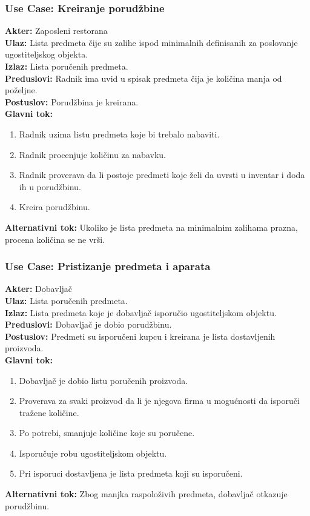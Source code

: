 \documentclass{article}
\begin{document}
\subsubsection{\textbf{Use Case}: Kreiranje porudžbine}
\textbf{Akter:} Zaposleni restorana\\
\textbf{Ulaz:} Lista predmeta čije su zalihe ispod minimalnih definisanih za poslovanje ugostiteljskog objekta.\\
\textbf{Izlaz:} Lista poručenih predmeta.\\
\textbf{Preduslovi:} Radnik ima uvid u spisak predmeta čija je količina manja od poželjne.\\
\textbf{Postuslov:} Porudžbina je kreirana.\\
\textbf{Glavni tok:} 
\begin{enumerate}
	\item Radnik uzima listu predmeta koje bi trebalo nabaviti.
	\item Radnik procenjuje količinu za nabavku. 
	\item Radnik proverava da li postoje predmeti koje želi da uvrsti u inventar i doda ih u porudžbinu.
	\item Kreira porudžbinu.
\end{enumerate}
\textbf{Alternativni tok:} Ukoliko je lista predmeta na minimalnim zalihama prazna, procena količina se ne vrši.\\

\subsubsection{\textbf{Use Case}:  Pristizanje predmeta i aparata}
\textbf{Akter:} Dobavljač\\
\textbf{Ulaz:} Lista poručenih predmeta.\\
\textbf{Izlaz:} Lista predmeta koje je dobavljač isporučio ugostiteljskom objektu.\\
\textbf{Preduslovi:} Dobavljač je dobio porudžbinu.\\
\textbf{Postuslov:} Predmeti su isporučeni kupcu i kreirana je lista dostavljenih proizvoda.\\
\textbf{Glavni tok:} 
\begin{enumerate}
	\item Dobavljač je dobio listu poručenih proizvoda.
	\item Proverava za svaki proizvod da li je njegova firma u mogućnosti da isporuči tražene količine.
	\item Po potrebi, smanjuje količine koje su poručene.
	\item Isporučuje robu ugostiteljskom objektu.
	\item Pri isporuci dostavljena je lista predmeta koji su isporučeni.
\end{enumerate}
\textbf{Alternativni tok:} Zbog manjka raspoloživih predmeta, dobavljač otkazuje porudžbinu.\\
\end{document}
